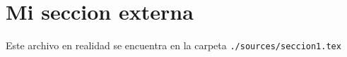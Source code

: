 \section{Mi seccion externa}

    Este archivo en realidad se encuentra en la carpeta \texttt{./sources/seccion1.tex}
